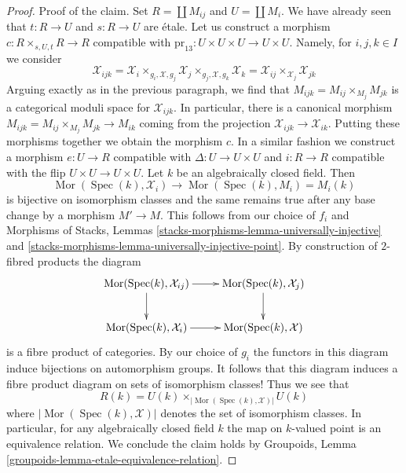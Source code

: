 \documentclass{stacks-project}
\theoremstyle{plain}
\theoremstyle{definition}
\theoremstyle{remark}
\numberwithin{equation}{subsection}
\def\Spec{\mathop{\mathrm{Spec}}}
\def\Mor{\mathop{\mathrm{Mor}}\nolimits}
\begin{document}
\begin{proof}
\medskip\noindent
Proof of the claim. Set $R = \coprod M_{ij}$ and $U = \coprod M_i$.
We have already seen that $t : R \to U$ and $s : R \to U$ are \'etale.
Let us construct a morphism $c : R \times_{s, U, t} R \to R$
compatible with $\text{pr}_{13} : U \times U \times U \to U \times U$.
Namely, for $i, j, k \in I$ we consider
$$
\mathcal{X}_{ijk} =
\mathcal{X}_i \times_{g_i, \mathcal{X}, g_j} \mathcal{X}_j
\times_{g_j, \mathcal{X}, g_k} \mathcal{X}_k =
\mathcal{X}_{ij} \times_{\mathcal{X}_j} \mathcal{X}_{jk}
$$
Arguing exactly as in the previous paragraph,
we find that $M_{ijk} = M_{ij} \times_{M_j} M_{jk}$
is a categorical moduli space for $\mathcal{X}_{ijk}$.
In particular, there is a canonical morphism
$M_{ijk} = M_{ij} \times_{M_j} M_{jk} \to M_{ik}$
coming from the projection $\mathcal{X}_{ijk} \to \mathcal{X}_{ik}$.
Putting these morphisms together we obtain the morphism $c$.
In a similar fashion we construct a morphism $e : U \to R$
compatible with $\Delta : U \to U \times U$ and
$i : R \to R$ compatible with the flip $U \times U \to U \times U$.
Let $k$ be an algebraically closed field. Then
$$
\Mor(\Spec(k), \mathcal{X}_i) \to \Mor(\Spec(k), M_i) = M_i(k)
$$
is bijective on isomorphism classes and the same remains true after any
base change by a morphism $M' \to M$. This follows from our choice
of $f_i$ and Morphisms of Stacks, Lemmas
\ref{stacks-morphisms-lemma-universally-injective} and
\ref{stacks-morphisms-lemma-universally-injective-point}.
By construction of $2$-fibred products the diagram
$$
\xymatrix{
\Mor(\Spec(k), \mathcal{X}_{ij}) \ar[d] \ar[r] &
\Mor(\Spec(k), \mathcal{X}_j) \ar[d] \\
\Mor(\Spec(k), \mathcal{X}_i) \ar[r] &
\Mor(\Spec(k), \mathcal{X})
}
$$
is a fibre product of categories. By our choice of $g_i$ the
functors in this diagram induce bijections on automorphism groups.
It follows that this diagram induces a fibre product diagram
on sets of isomorphism classes! Thus we see that
$$
R(k) = U(k) \times_{|\Mor(\Spec(k), \mathcal{X})|} U(k)
$$
where $|\Mor(\Spec(k), \mathcal{X})|$ denotes the set
of isomorphism classes.
In particular, for any algebraically closed field $k$
the map on $k$-valued point is an equivalence relation.
We conclude the claim holds by
Groupoids, Lemma \ref{groupoids-lemma-etale-equivalence-relation}.


\end{proof}
\end{document}
